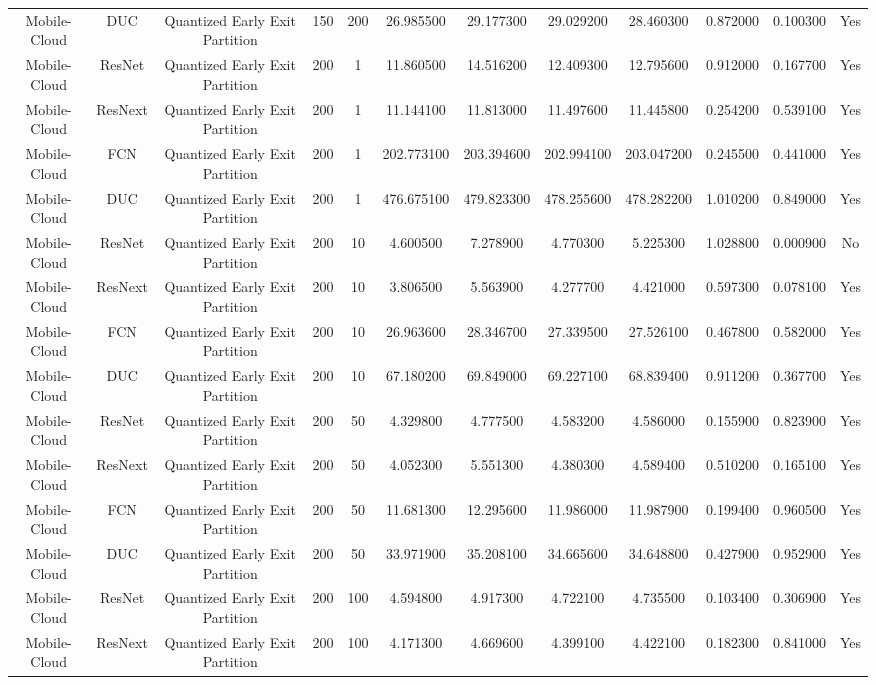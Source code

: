 \begin{tabular}{|c||c||c||c||c||c||c||c||c||c||c||c|}
Mobile-Cloud & DUC & Quantized Early Exit Partition & 150 & 200 & 26.985500 & 29.177300 & 29.029200 & 28.460300 & 0.872000 & 0.100300 & Yes \\
Mobile-Cloud & ResNet & Quantized Early Exit Partition & 200 & 1 & 11.860500 & 14.516200 & 12.409300 & 12.795600 & 0.912000 & 0.167700 & Yes \\
Mobile-Cloud & ResNext & Quantized Early Exit Partition & 200 & 1 & 11.144100 & 11.813000 & 11.497600 & 11.445800 & 0.254200 & 0.539100 & Yes \\
Mobile-Cloud & FCN & Quantized Early Exit Partition & 200 & 1 & 202.773100 & 203.394600 & 202.994100 & 203.047200 & 0.245500 & 0.441000 & Yes \\
Mobile-Cloud & DUC & Quantized Early Exit Partition & 200 & 1 & 476.675100 & 479.823300 & 478.255600 & 478.282200 & 1.010200 & 0.849000 & Yes \\
Mobile-Cloud & ResNet & Quantized Early Exit Partition & 200 & 10 & 4.600500 & 7.278900 & 4.770300 & 5.225300 & 1.028800 & 0.000900 & No \\
Mobile-Cloud & ResNext & Quantized Early Exit Partition & 200 & 10 & 3.806500 & 5.563900 & 4.277700 & 4.421000 & 0.597300 & 0.078100 & Yes \\
Mobile-Cloud & FCN & Quantized Early Exit Partition & 200 & 10 & 26.963600 & 28.346700 & 27.339500 & 27.526100 & 0.467800 & 0.582000 & Yes \\
Mobile-Cloud & DUC & Quantized Early Exit Partition & 200 & 10 & 67.180200 & 69.849000 & 69.227100 & 68.839400 & 0.911200 & 0.367700 & Yes \\
Mobile-Cloud & ResNet & Quantized Early Exit Partition & 200 & 50 & 4.329800 & 4.777500 & 4.583200 & 4.586000 & 0.155900 & 0.823900 & Yes \\
Mobile-Cloud & ResNext & Quantized Early Exit Partition & 200 & 50 & 4.052300 & 5.551300 & 4.380300 & 4.589400 & 0.510200 & 0.165100 & Yes \\
Mobile-Cloud & FCN & Quantized Early Exit Partition & 200 & 50 & 11.681300 & 12.295600 & 11.986000 & 11.987900 & 0.199400 & 0.960500 & Yes \\
Mobile-Cloud & DUC & Quantized Early Exit Partition & 200 & 50 & 33.971900 & 35.208100 & 34.665600 & 34.648800 & 0.427900 & 0.952900 & Yes \\
Mobile-Cloud & ResNet & Quantized Early Exit Partition & 200 & 100 & 4.594800 & 4.917300 & 4.722100 & 4.735500 & 0.103400 & 0.306900 & Yes \\
Mobile-Cloud & ResNext & Quantized Early Exit Partition & 200 & 100 & 4.171300 & 4.669600 & 4.399100 & 4.422100 & 0.182300 & 0.841000 & Yes \\

\end{tabular}

